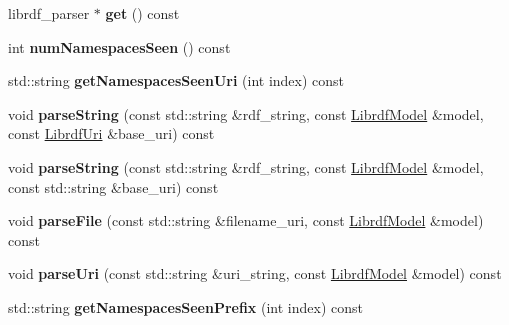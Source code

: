 \begin{DoxyCompactItemize}
\mbox{\label{classredland_1_1LibrdfParser_aadb297b986879ca618d3092fe737d41c}} 
librdf\+\_\+parser $\ast$ {\bfseries get} () const
\item 
\mbox{\label{classredland_1_1LibrdfParser_a1e2098e2c99ba886ab1521048258600c}} 
int {\bfseries num\+Namespaces\+Seen} () const
\item 
\mbox{\label{classredland_1_1LibrdfParser_aed92021f88bccfa26bf78c29797b4208}} 
std\+::string {\bfseries get\+Namespaces\+Seen\+Uri} (int index) const
\item 
\mbox{\label{classredland_1_1LibrdfParser_a86739506ba32a9a6da8b69711f1026db}} 
void {\bfseries parse\+String} (const std\+::string \&rdf\+\_\+string, const \hyperlink{classredland_1_1LibrdfModel}{Librdf\+Model} \&model, const \hyperlink{classredland_1_1LibrdfUri}{Librdf\+Uri} \&base\+\_\+uri) const
\item 
\mbox{\label{classredland_1_1LibrdfParser_a2a7ac5ac97b4bc5876db02f0b9c7b987}} 
void {\bfseries parse\+String} (const std\+::string \&rdf\+\_\+string, const \hyperlink{classredland_1_1LibrdfModel}{Librdf\+Model} \&model, const std\+::string \&base\+\_\+uri) const
\item 
\mbox{\label{classredland_1_1LibrdfParser_a15ffb21bf48e486708eab820719827a6}} 
void {\bfseries parse\+File} (const std\+::string \&filename\+\_\+uri, const \hyperlink{classredland_1_1LibrdfModel}{Librdf\+Model} \&model) const
\item 
\mbox{\label{classredland_1_1LibrdfParser_a733bf5d33a2d71bd6d7c201e1c952b04}} 
void {\bfseries parse\+Uri} (const std\+::string \&uri\+\_\+string, const \hyperlink{classredland_1_1LibrdfModel}{Librdf\+Model} \&model) const
\item 
\mbox{\label{classredland_1_1LibrdfParser_a89d1335343c9999db8207866de8202c1}} 
std\+::string {\bfseries get\+Namespaces\+Seen\+Prefix} (int index) const
\item 
\mbox{\label{classredland_1_1LibrdfParser_aaa813cd98f57703e2168e81cf1c8b356}} 

\end{DoxyCompactItemize}
